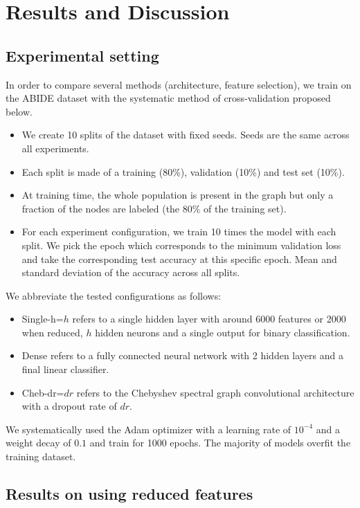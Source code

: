 \section{Results and Discussion}



\subsection{Experimental setting}
In order to compare several methods (architecture, feature selection), we train on the ABIDE dataset with the systematic method of cross-validation proposed below.
\begin{itemize}
	\item We create 10 splits of the dataset with fixed seeds. Seeds are the same across all experiments.
	\item Each split is made of a training (80\%), validation (10\%) and test set (10\%).
	\item At training time, the whole population is present in the graph but only a fraction of the nodes are labeled (the 80\% of the training set).
	\item For each experiment configuration, we train 10 times the model with each split.
	We pick the epoch which corresponds to the minimum validation loss and take the corresponding test accuracy at this specific epoch. Mean and standard deviation of the accuracy across all splits.
\end{itemize}

We abbreviate the tested configurations as follows:
\begin{itemize}
	\item Single-h=$h$ refers to a single hidden layer with around 6000 features or 2000 when reduced, $h$ hidden neurons and a single output for binary classification.
	\item Dense refers to a fully connected neural network with 2 hidden layers and a final linear classifier.
	\item Cheb-dr=$dr$ refers to the Chebyshev spectral graph convolutional \cite{Defferrard2016} architecture with a dropout rate of $dr$.
\end{itemize}

We systematically used the Adam optimizer with a learning rate of $10^{-4}$ and a weight decay of $0.1$ and train for 1000 epochs.
The majority of models overfit the training dataset.

\subsection{Results on using reduced features}

